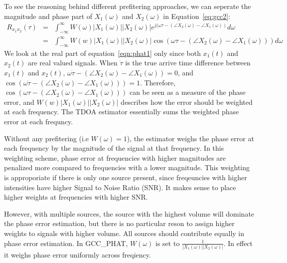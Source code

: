 To see the reasoning behind different prefitering approaches, we can seperate the magnitude and phase part of $X_1(\omega)$ and $X_2(\omega)$ in Equation~\ref{eq:gcc2}:
\begin{eqnarray}
\label{eqn:phat1}
R_{x_1x_2}(\tau) &=& \int_{-\infty}^\infty W(\omega) |X_1(\omega)||X_2(\omega)| e^{j(\omega\tau - (\angle{X_2(\omega)} - \angle{X_1(\omega)}) } d\omega\\
&=& \int_{-\infty}^\infty W(w)|X_1(\omega)| |X_2(\omega)| \cos(\omega\tau - (\angle X_2(\omega) - \angle X_1(\omega))) d\omega
\end{eqnarray}
We look at the real part of equation~\ref{eqn:phat1} only since both $x_1(t)$ and $x_2(t)$ are real valued signals. When $\dot \tau$ is the true arrive time difference between $x_1(t)$ and $x_2(t)$, $\omega \dot \tau - (\angle X_2(\omega) - \angle X_1(\omega)) = 0$, and $\cos(\omega \dot \tau - (\angle X_2(\omega) - \angle X_1(\omega))) = 1$. Therefore, $\cos(\omega\tau - (\angle X_2(\omega) - \angle X_1(\omega)))$ can be seen as a measure of the phase error, and $W(w)|X_1(\omega)||X_2(\omega)|$ describes how the error should be weighted at each frequency. The TDOA estimator essentially sums the weighted phase error at each frequncy. 

Without any prefitering (i.e $W(\omega)=1$), the estimator weighs the phase error at each frequency by the magnitude of the signal at that frequency. In this weighting scheme, phase error at frequencies with higher magnitudes are penalized more compared to frequencies with a lower magnitude. This weighting is approporiate if there is only one source present, since freqeuncies with higher intensities have higher Signal to Noise Ratio (SNR). It makes sense to place higher weights at frequencies with higher SNR. 

However, with multiple sources, the source with the highest volume will dominate the phase error estimation, but there is no particular reson to assign higher weights to signals with higher volume. All sources should contribute equally in phase error estimation. In GCC\_PHAT,  $W(\omega)$ is set to $\frac{1}{|X_1(\omega)||X_2(\omega)|}$. In effect it weighs phase error uniformly across freqiency. 
